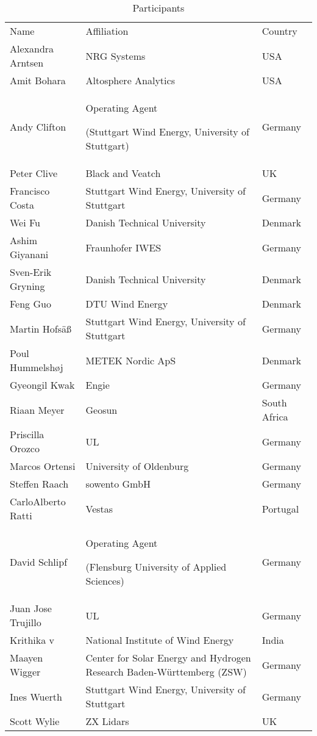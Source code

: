 
\begin{table*}
    \centering
    \caption{Participants}
    \begin{tabular}{@{}|p{}|p{}|p{}|@{}}
    \rowcolor{Task32Blue2} Name & Affiliation & Country \\
	Alexandra Arntsen & NRG Systems & USA \\
	Amit Bohara & Altosphere Analytics & USA \\
	Andy Clifton & Operating Agent

(Stuttgart Wind Energy, University of Stuttgart) & Germany \\
	Peter Clive & Black and Veatch & UK \\
	Francisco Costa & Stuttgart Wind Energy, University of Stuttgart &
Germany \\
	Wei Fu & Danish Technical University & Denmark \\
	Ashim Giyanani & Fraunhofer IWES & Germany \\
	Sven-Erik Gryning & Danish Technical University & Denmark \\
Feng Guo & DTU Wind Energy & Denmark \\
Martin Hofs\"aß & Stuttgart Wind Energy, University of Stuttgart &
Germany \\
	Poul Hummelshøj & METEK Nordic ApS & Denmark \\
	Gyeongil Kwak & Engie & Germany \\
	Riaan Meyer & Geosun & South Africa \\
	Priscilla Orozco & UL & Germany \\
	Marcos Ortensi & University of Oldenburg & Germany \\
	Steffen Raach &
		sowento GmbH & Germany \\
	CarloAlberto Ratti & Vestas & Portugal \\
	David Schlipf & 
		Operating Agent

		(Flensburg University of Applied Sciences) & Germany \\
	Juan Jose Trujillo & UL & Germany \\
	Krithika v &
		National Institute of Wind Energy & India \\
	Maayen Wigger & Center for Solar Energy and Hydrogen Research Baden-Württemberg (ZSW) & Germany \\
	Ines Wuerth & Stuttgart Wind Energy, University of Stuttgart & Germany \\
	Scott Wylie & ZX Lidars & UK \\
	\end{tabular}
\label{tab:participants}
\end{table*}
